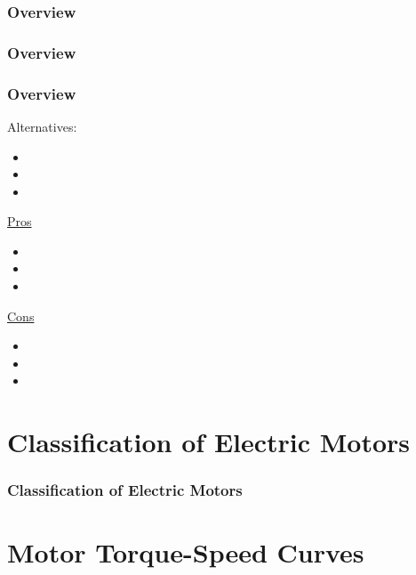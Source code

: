 \documentclass[fleqn]{beamer} %
\newcommand{\sectiontitleI}{Overview} %
\newcommand{\sectiontitleII}{Classification of Electric Motors}
\newcommand{\sectiontitleIII}{Motor Torque-Speed Curves}
\begin{document}
	\begin{frame}[label=sectionI] \small
		\frametitle{\sectiontitleI}	
		

	\end{frame}

	\begin{frame} \small
		\frametitle{\sectiontitleI}

	
	\end{frame}

	\begin{frame} \small
		\frametitle{\sectiontitleI}

		Alternatives:
		\begin{itemize}
			\item  
			\item
			\item
        \end{itemize}


        \begin{multicols}{2}
		\underline{Pros}
		\begin{itemize}
		\item
		\item
		\item
		\end{itemize}
		\underline{Cons}
		\begin{itemize}
		\item 
		\item
		\item
		\end{itemize}
		\end{multicols}

	\end{frame}

	
\section{\sectiontitleII}	

	\begin{frame}[label=sectionI] \small
		\frametitle{\sectiontitleII}

	\end{frame}

\section{\sectiontitleIII}	
\end{document}
